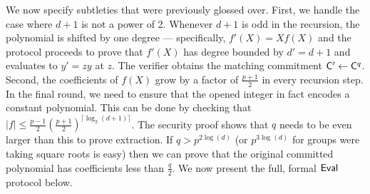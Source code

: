 We now specify subtleties that were previously glossed over. 
First, we handle the case where $d+1$ is not a power of 2.  Whenever $d+1$ is odd in the recursion, the polynomial is shifted by one degree --- specifically, $f'(X) = X f(X)$ and the protocol proceeds to prove that $f'(X)$ has degree bounded by $d' = d+1$ and evaluates to $y' = zy$ at $z$. The verifier obtains the matching commitment $\mathsf{C}'\gets\mathsf{C}^q$. Second, the coefficients of $f(X)$ grow by a factor of $\frac{p+1}{2}$ in every recursion step. In the final round, we need to ensure that the opened integer in fact encodes a constant polynomial. This can be done by checking that $|f|\leq \frac{p-1}{2}(\frac{p+1}{2})^{\lceil\log_2(d+1)\rceil}$. The security proof shows that $q$ needs to be even larger than this to prove extraction. If $q>p^{2\log(d)}$ (or $p^{3\log(d)}$ for groups were taking square roots is easy) then we can prove that the original committed polynomial has coefficients less than $\frac{q}{2}$.
 We now present the full, formal $\textsf{{Eval}}$ protocol below.
